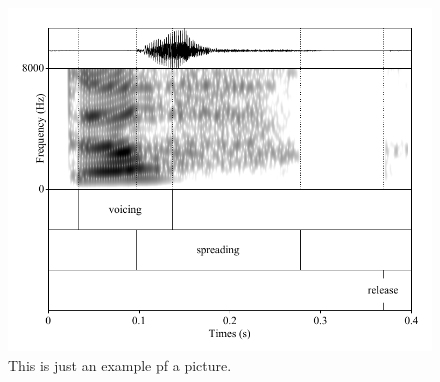 \documentclass[11pt,a4paper,openany]{memoir}\usepackage[]{graphicx}\usepackage[]{color}
\begin{document}
\begin{figure}[p]
\includegraphics[width=\textwidth]{dokk-spr}
\caption{This is just an example pf a picture.}
\label{f:spr-annotation}
\end{figure}








\end{document}
